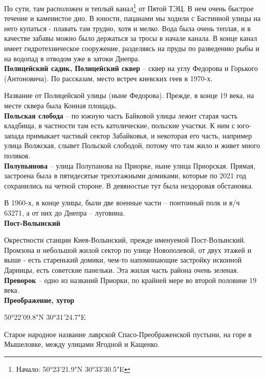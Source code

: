 По сути, там расположен и теплый канал\footnote{Начало: 50°23'21.9"N 30°33'30.5"E} от Пятой ТЭЦ. В нем очень быстрое течение и каменистое дно. В юности, пацанами мы ходили с Бастинной улицы на него купаться - плавать там трудно, хотя и мелко. Вода была очень теплая, и в качестве забавы можно было держаться за тросы в начале канала. В конце канал имеет гидротехническое сооружение, разделяясь на пруды по разведению рыбы и на водопад в отводом уже в затоки Днепра.\\

\textbf{Полицейский садик, Полицейский сквер} – сквер на углу Федорова и Горького (Антоновича). По рассказам, место встреч киевских геев в 1970-х.

Название от Полицейской улицы (ныне Федорова). Прежде, в конце 19 века, на месте сквера была Конная площадь.\\

\textbf{Польская слобода} – по южную часть Байковой улицы лежит старая часть кладбища, в частности там есть католические, польские участки. К ним с юго-запада примыкает частный сектор Забайковья, и некоторая его часть, например улица Волжская, слывет Польской слободой, потому что там жило и живет много поляков.\\

\textbf{Полупьянова} – улица Полупанова на Приорке, ныне улица Приорская. Прямая, застроена была в пятидесятые трехэтажными домиками, которые по 2021 год сохранились на четной стороне. В девяностые тут была нездоровая обстановка.

В 1960-х, в конце улицы, были две военные части – понтонный полк и в/ч 63271, а от них до Днепра – луговина.\\


\textbf{Пост-Волынский}

Окрестности станции Киев-Волынский, прежде именуемой Пост-Волынский. Промзона и небольшой жилой сектор по улице Новополевой, от двух этажей и выше - есть старенький домики, чем-то напоминающие застройку исконной Дарницы, есть советские  панельки. Эта жилая часть района очень зеленая.\\

\textbf{Преворок} – одно из названий Приорки, по крайней мере во второй половине 19 века.\\

\textbf{Преображение, хутор} 

50°22'09.8"N 30°31'24.7"E

Старое народное название лаврской Спасо-Преображенской пустыни, на горе в Мышеловке, между улицами Ягодной и Кащенко. 

